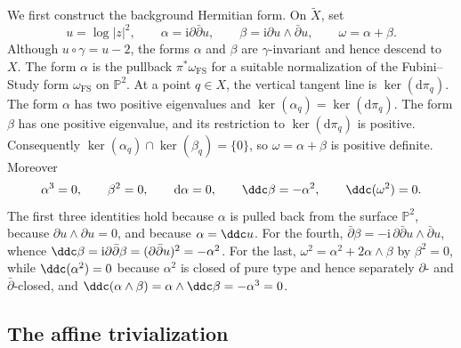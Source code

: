 \documentclass[11pt,a4paper]{article}
\begin{document}
	We first construct the background Hermitian form.  On $\widetilde X$, set
	\[
	u=\log|z|^2,
	\qquad
	\alpha=\mathrm{i}\partial\bar\partial u,
	\qquad
	\beta=\mathrm{i}\partial u\wedge\bar\partial u,
	\qquad
	\omega=\alpha+\beta.
	\]
	Although $u\circ\gamma=u-2$, the forms $\alpha$ and $\beta$ are
	$\gamma$-invariant and hence descend to $X$.  The form $\alpha$ is the
	pullback $\pi^*\omega_{\mathrm{FS}}$ for a suitable normalization of
	the Fubini--Study form $\omega_{\mathrm{FS}}$ on $\mathbb P^2$.  At a point
	$q\in X$, the vertical tangent line is $\ker(\mathrm{d}\pi_q)$.
	The form $\alpha$ has two positive eigenvalues and
	$\ker(\alpha_q)=\ker(\mathrm{d}\pi_q)$.  The form $\beta$ has one positive
	eigenvalue, and its restriction to $\ker(\mathrm{d}\pi_q)$ is positive.
	Consequently $\ker(\alpha_q)\cap\ker(\beta_q)=\{0\}$, so
	$\omega=\alpha+\beta$ is positive definite.  Moreover
	\begin{equation}
		\alpha^3=0,
		\qquad \beta^2=0,
		\qquad \mathrm{d}\alpha=0,
		\qquad \ddc\beta=-\alpha^2,
		\qquad \ddc(\omega^2)=0.
		\label{eq:hopf-identities}
	\end{equation}
	The first three identities hold because $\alpha$ is pulled back from
	the surface $\mathbb P^2$, because $\partial u\wedge\partial u=0$, and
	because $\alpha=\ddc u$.  For the fourth,
	$\bar\partial\beta=-\mathrm{i}\,\partial\bar\partial u\wedge
	\bar\partial u$, whence
	$\ddc\beta=\mathrm{i}\partial\bar\partial\beta
	=(\partial\bar\partial u)^2=-\alpha^2$.  For the last,
	$\omega^2=\alpha^2+2\alpha\wedge\beta$ by $\beta^2=0$, while
	$\ddc(\alpha^2)=0$ because $\alpha^2$ is closed of pure type and hence
	separately $\partial$- and $\bar\partial$-closed, and
	$\ddc(\alpha\wedge\beta)=\alpha\wedge\ddc\beta=-\alpha^3=0$.
	
	\subsection{The affine trivialization}
\end{document}
